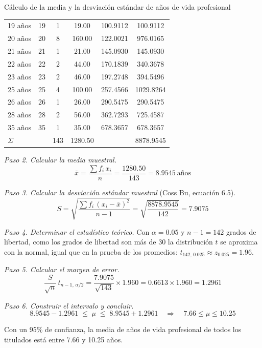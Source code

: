 \begin{mitabla}{Cálculo de la media y la desviación estándar de años de vida profesional}
\begin{tabular}{lccccc}
19 años & 19 & 1 & 19.00 & 100.9112 & 100.9112 \\
20 años & 20 & 8 & 160.00 & 122.0021 & 976.0165 \\
21 años & 21 & 1 & 21.00 & 145.0930 & 145.0930 \\
22 años & 22 & 2 & 44.00 & 170.1839 & 340.3678 \\
23 años & 23 & 2 & 46.00 & 197.2748 & 394.5496 \\
25 años & 25 & 4 & 100.00 & 257.4566 & 1029.8264 \\
26 años & 26 & 1 & 26.00 & 290.5475 & 290.5475 \\
28 años & 28 & 2 & 56.00 & 362.7293 & 725.4587 \\
35 años & 35 & 1 & 35.00 & 678.3657 & 678.3657 \\
\midrule
$\Sigma$ & & 143 & 1280.50 & & 8878.9545 \\
\bottomrule
\end{tabular}
\end{mitabla}

\textit{Paso 2. Calcular la media muestral.}
\[
\bar{x} = \frac{\sum f_i\,x_i}{n} = \frac{1280.50}{143} = 8.9545\ \text{años}
\]

\textit{Paso 3. Calcular la desviación estándar muestral} (Coss Bu, ecuación 6.5).
\[
S = \sqrt{\frac{\sum f_i\,(x_i-\bar{x})^2}{n-1}} = \sqrt{\frac{8878.9545}{142}} = 7.9075
\]

\textit{Paso 4. Determinar el estadístico teórico.} Con $\alpha = 0.05$ y $n-1 = 142$ grados de libertad, como los grados de libertad son más de 30 la distribución $t$ se aproxima con la normal, igual que en la prueba de los promedios: $t_{142,\,0.025} \approx z_{0.025} = 1.96$.

\textit{Paso 5. Calcular el margen de error.}
\[
\frac{S}{\sqrt{n}}\,t_{n-1,\,\alpha/2} = \frac{7.9075}{\sqrt{143}}\times 1.960 = 0.6613 \times 1.960 = 1.2961
\]

\textit{Paso 6. Construir el intervalo y concluir.}
\[
8.9545 - 1.2961 \;\le\; \mu \;\le\; 8.9545 + 1.2961 \quad\Longrightarrow\quad 7.66 \le \mu \le 10.25
\]

Con un 95\% de confianza, la media de años de vida profesional de todos los titulados está entre 7.66 y 10.25 años.

